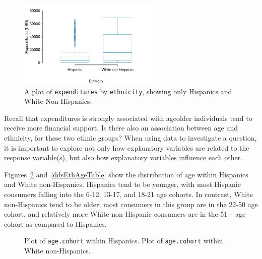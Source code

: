 \begin{figure}[h]
	\centering
	\includegraphics[width=0.6\textwidth]{ch_intro_to_data_oi_biostat/figures/ddsExpHispWhite/ddsExpHispWhite}
	\caption{A plot of \texttt{expenditures} by \texttt{ethnicity}, showing only Hispanics and White Non-Hispanics.}
	\label{ddsExpHispWhite}
\end{figure}

Recall that expenditures is strongly associated with age\textemdash older individuals tend to receive more financial support. Is there also an association between age and ethnicity, for these two ethnic groups? When using data to investigate a question, it is important to explore not only how explanatory variables are related to the response variable(s), but also how explanatory variables influence each other. 

Figures~\ref{ddsAgeCohortPlots} and~\ref{ddsEthAgeTable} show the distribution of age within Hispanics and White non-Hispanics. Hispanics tend to be younger, with most Hispanic consumers falling into the 6-12, 13-17, and 18-21 age cohorts. In contrast, White non-Hispanics tend to be older; most consumers in this group are in the 22-50 age cohort, and relatively more White non-Hispanic consumers are in the 51+ age cohort as compared to Hispanics.

\begin{figure}[ht]
	\centering
	\caption{ Plot of \texttt{age.cohort} within Hispanics.  Plot of \texttt{age.cohort} within White non-Hispanics.}
	\label{ddsAgeCohortPlots}
\end{figure}

